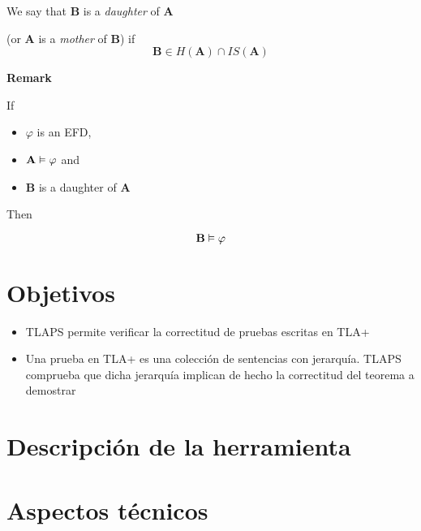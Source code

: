 \documentclass[12pt]{beamer}
\newenvironment{stepitemize}{\begin{itemize}[<+->]}{\end{itemize} }
\begin{document}
\begin{frame}
 \begin{definition}
  We say that $\mathbf{B}$ is a \textit{daughter} of $\mathbf{A}$ 

(or $\mathbf{A}$ is a \textit{mother} of $\mathbf{B}$) if 
\[ \mathbf{B} \in H(\mathbf{A}) \cap IS(\mathbf{A}) \]

 \end{definition}

\textbf{Remark} 

If 

\begin{stepitemize}
 \item $\varphi$ is an EFD,
 \item $\mathbf{A} \vDash \varphi$ and 
 \item $\mathbf{B}$ is a daughter of $\mathbf{A}$
\end{stepitemize}

\pause

Then

\[ \mathbf{B} \vDash \varphi \]


\end{frame}


\section{Objetivos}
\begin{frame}
\begin{stepitemize}
 \item TLAPS permite verificar la correctitud de pruebas escritas en TLA+
 \pause
 \item Una prueba en TLA+ es una colección de sentencias con jerarquía. TLAPS comprueba que dicha jerarquía implican de hecho la correctitud del teorema a demostrar
\end{stepitemize}
\end{frame}

\section{Descripción de la herramienta}
\begin{frame}
 
 
\end{frame}

\section{Aspectos técnicos}
\begin{frame}
\end{frame}
\end{document}
